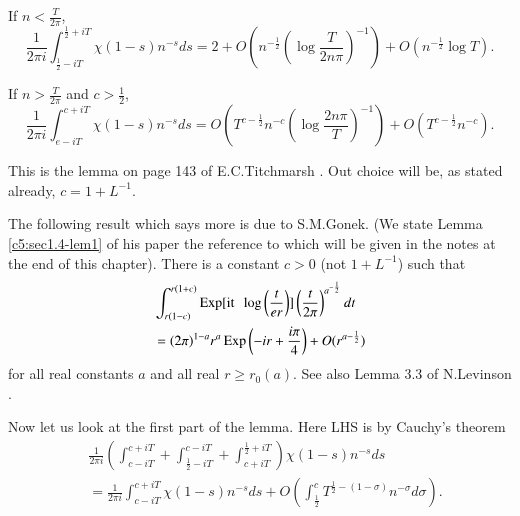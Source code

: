 \setcounter{lem}{0}
\begin{lem}\label{c5:sec1.4-lem1}
If $n<\frac{T}{2\pi}$,
\begin{equation*}
\frac{1}{2\pi
  i}\int^{\frac{1}{2}+iT}_{\frac{1}{2}-iT}\chi(1-s)n^{-s}ds=2+O\left(n^{-\frac{1}{2}}\left(\log
\frac{T}{2n\pi}\right)^{-1}\right)+O(n^{-\frac{1}{2}}\log
T).\tag{5.4.10}\label{c5:eq5.4.10} 
\end{equation*}

If $n>\frac{T}{2\pi}$ and $c>\frac{1}{2}$, 
\begin{equation*}
\frac{1}{2\pi
  i}\int^{c+iT}_{e-iT}\chi(1-s)n^{-s}ds=O\left(T^{c-\frac{1}{2}}n^{-c}\left(\log
\frac{2n\pi}{T}\right)^{-1}\right)+O(T^{c-\frac{1}{2}}n^{-c}).\tag{5.4.11}\label{c5:eq5.4.11} 
\end{equation*}
\end{lem}

\setcounter{remark}{0}
\begin{remark}\label{c5:sec1.4-rem1}
This is the lemma on page 143 of E.C.\@ Titchmarsh \cite{Titchmarsh1}. Out
choice will be, as stated already, $c=1+L^{-1}$.
\end{remark}

\begin{remark}\label{c5:sec1.4-rem2}
The following result which says more is due to S.M.\@ Gonek. (We state
Lemma \ref{c5:sec1.4-lem1} of his paper the reference to which will
be given in the notes at the end of this chapter). There is a constant
$c>0$ (not $1+L^{-1}$) such that
\begin{align*}
& \int^{r(1+c)}_{r(1-c)}\operatorname{Exp} [\text{it~ }
    \log \left(\frac{t}{er} \right)] \left(\frac{t}{2\pi} \right)^{a^{-\frac{1}{2}}}dt\\
&= (2\pi)^{1-a}r^{a}\operatorname{Exp} \left(-ir+\frac{i\pi}{4} \right)+O(r^{a-\frac{1}{2}})
\end{align*}
for all real constants $a$ and all real $r\geq r_{0}(a)$. See also
Lemma 3.3 of N.\@ Levinson \cite{Levinson2}.
\end{remark}

Now let us look at the first part of the lemma. Here LHS is by
Cauchy's theorem 
\begin{align*}
& \frac{1}{2\pi
    i}\left(\int^{c+iT}_{c-iT}+\int^{c-iT}_{\frac{1}{2}-iT}+\int^{\frac{1}{2}+iT}_{c+iT}\right)\chi(1-s)n^{-s}ds\\
& =\frac{1}{2\pi    i}\int^{c+iT}_{c-iT}\chi(1-s)n^{-s}ds+O\left(\int^{c}_{\frac{1}{2}}T^{\frac{1}{2}-(1-\sigma)}n^{-\sigma}d\sigma\right). 
\end{align*}\pageoriginale

